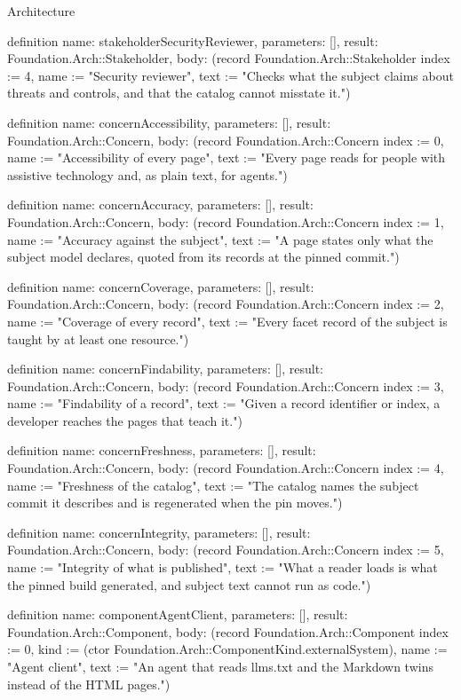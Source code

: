 \begin{lexlean}{Architecture}
\begin{semanticmodule}
definition{
  name: stakeholderSecurityReviewer,
  parameters: [],
  result: Foundation.Arch::Stakeholder,
  body: (record Foundation.Arch::Stakeholder {index := 4, name := "Security reviewer", text := "Checks what the subject claims about threats and controls, and that the catalog cannot misstate it."})
}

definition{
  name: concernAccessibility,
  parameters: [],
  result: Foundation.Arch::Concern,
  body: (record Foundation.Arch::Concern {index := 0, name := "Accessibility of every page", text := "Every page reads for people with assistive technology and, as plain text, for agents."})
}

definition{
  name: concernAccuracy,
  parameters: [],
  result: Foundation.Arch::Concern,
  body: (record Foundation.Arch::Concern {index := 1, name := "Accuracy against the subject", text := "A page states only what the subject model declares, quoted from its records at the pinned commit."})
}

definition{
  name: concernCoverage,
  parameters: [],
  result: Foundation.Arch::Concern,
  body: (record Foundation.Arch::Concern {index := 2, name := "Coverage of every record", text := "Every facet record of the subject is taught by at least one resource."})
}

definition{
  name: concernFindability,
  parameters: [],
  result: Foundation.Arch::Concern,
  body: (record Foundation.Arch::Concern {index := 3, name := "Findability of a record", text := "Given a record identifier or index, a developer reaches the pages that teach it."})
}

definition{
  name: concernFreshness,
  parameters: [],
  result: Foundation.Arch::Concern,
  body: (record Foundation.Arch::Concern {index := 4, name := "Freshness of the catalog", text := "The catalog names the subject commit it describes and is regenerated when the pin moves."})
}

definition{
  name: concernIntegrity,
  parameters: [],
  result: Foundation.Arch::Concern,
  body: (record Foundation.Arch::Concern {index := 5, name := "Integrity of what is published", text := "What a reader loads is what the pinned build generated, and subject text cannot run as code."})
}

definition{
  name: componentAgentClient,
  parameters: [],
  result: Foundation.Arch::Component,
  body: (record Foundation.Arch::Component {index := 0, kind := (ctor Foundation.Arch::ComponentKind.externalSystem), name := "Agent client", text := "An agent that reads llms.txt and the Markdown twins instead of the HTML pages."})
}


\end{semanticmodule}
\end{lexlean}
